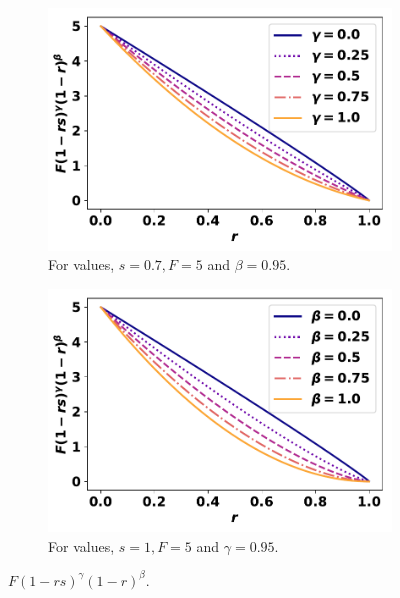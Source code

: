 \documentclass[10pt]{article}
\begin{document}
\begin{figure}[!htbp]
\begin{center}
    \begin{subfigure}{0.40\textwidth}
        \includegraphics[width=\linewidth]{images/gammas_curve.pdf}
        \caption{For values, \(s=0.7, F=5\) and \(\beta=0.95\).}
    \end{subfigure}
    \begin{subfigure}{0.40\textwidth}
        \includegraphics[width=\linewidth]{images/betas_curve.pdf}
        \caption{For values, \(s=1, F=5\) and \(\gamma=0.95\).}
    \end{subfigure}
\caption{\(F (1 - rs)^{\gamma} (1 - r)^{\beta}\).}\label{fig:CostCurves}
\end{center}
\end{figure}
\end{document}

